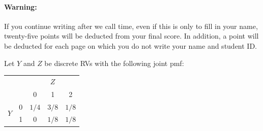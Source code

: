 \documentclass[addpoints,12pt]{exam}
\begin{document}
\paragraph{Warning:} If you continue writing after we call time, even if this is only to fill in your name, twenty-five points will be deducted from your final score. In addition, a point will be deducted for each page on which you do not write your name and student ID. 

\newpage

\begin{questions}

  \question Let $Y$ and $Z$ be discrete RVs with the following joint pmf:
			\begin{center}
\begin{tabular}{|cc|ccc|}
\hline
&&\multicolumn{3}{c|}{$Z$}\\
&&0 & 1 & 2\\
\hline
\multirow{2}{*}{$Y$}
&0& \multicolumn{1}{|c}{$1/4$} & $3/8$ & $1/8$ \\
&1& \multicolumn{1}{|c}{0} & $1/8$ & $1/8$\\
\hline
\end{tabular}
\end{center}
\end{questions}
\end{document}
